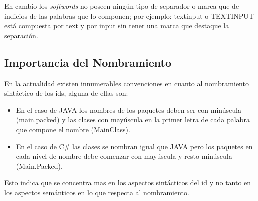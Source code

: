 \documentclass[a4paper,12pt]{report}
\begin{document}
En cambio los \textit{softwords} no poseen ningún tipo de separador o marca que de indicios de las palabras que lo componen; por ejemplo: \textsf{textinput} o \textsf{TEXTINPUT} está compuesta por \textsf{text} y por \textsf{input} sin tener una marca que destaque la separación.




\subsection{Importancia del Nombramiento}
En la actualidad existen innumerables convenciones en cuanto al nombramiento sintáctico de los ids, alguna de ellas son:

\begin{itemize}
\itemsep0em%
\item En el caso de JAVA los nombres de los paquetes deben ser con minúscula (main.packed) y las clases con mayúscula en la primer letra de cada palabra que compone el nombre (MainClass).

\item En el caso de C\# las clases se nombran igual que JAVA pero los paquetes en cada nivel de nombre debe comenzar con mayúscula y resto minúscula (Main.Packed).
\end{itemize}

Esto indica que se concentra mas en los aspectos sintácticos del id y no tanto en los aspectos semánticos en lo que respecta al nombramiento. 

\end{document}
